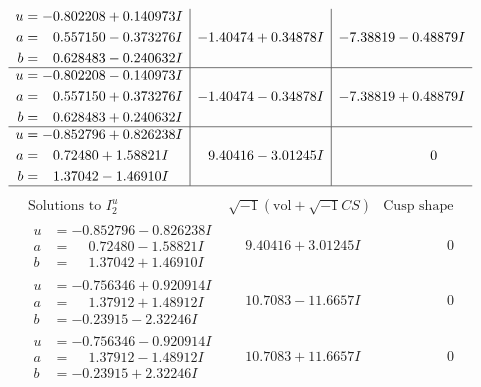 \documentclass[1p]{elsarticle_modified}
\theoremstyle{definition}
\newcommand{\I}{\sqrt{-1}}
\begin{document}
$$\begin{array}{c|c|c}
\begin{aligned}
u &= -0.802208 + 0.140973 I \\
a &= \phantom{-}0.557150 - 0.373276 I \\
b &= \phantom{-}0.628483 - 0.240632 I\end{aligned}
 & -1.40474 + 0.34878 I & -7.38819 - 0.48879 I \\ \hline\begin{aligned}
u &= -0.802208 - 0.140973 I \\
a &= \phantom{-}0.557150 + 0.373276 I \\
b &= \phantom{-}0.628483 + 0.240632 I\end{aligned}
 & -1.40474 - 0.34878 I & -7.38819 + 0.48879 I \\ \hline\begin{aligned}
u &= -0.852796 + 0.826238 I \\
a &= \phantom{-}0.72480 + 1.58821 I \\
b &= \phantom{-}1.37042 - 1.46910 I\end{aligned}
 & \phantom{-}9.40416 - 3.01245 I & \phantom{-0.000000 } 0\\
 \hline 
 \end{array}$$\newpage$$\begin{array}{c|c|c}  
\text{Solutions to }I^u_{2}& \I (\text{vol} + \sqrt{-1}CS) & \text{Cusp shape}\\
 \hline 
\begin{aligned}
u &= -0.852796 - 0.826238 I \\
a &= \phantom{-}0.72480 - 1.58821 I \\
b &= \phantom{-}1.37042 + 1.46910 I\end{aligned}
 & \phantom{-}9.40416 + 3.01245 I & \phantom{-0.000000 } 0 \\ \hline\begin{aligned}
u &= -0.756346 + 0.920914 I \\
a &= \phantom{-}1.37912 + 1.48912 I \\
b &= -0.23915 - 2.32246 I\end{aligned}
 & \phantom{-}10.7083 - 11.6657 I & \phantom{-0.000000 } 0 \\ \hline\begin{aligned}
u &= -0.756346 - 0.920914 I \\
a &= \phantom{-}1.37912 - 1.48912 I \\
b &= -0.23915 + 2.32246 I\end{aligned}
 & \phantom{-}10.7083 + 11.6657 I & \phantom{-0.000000 } 0 \\ \hline\begin{aligned}

\end{aligned}
\end{array}$$
\end{document}
